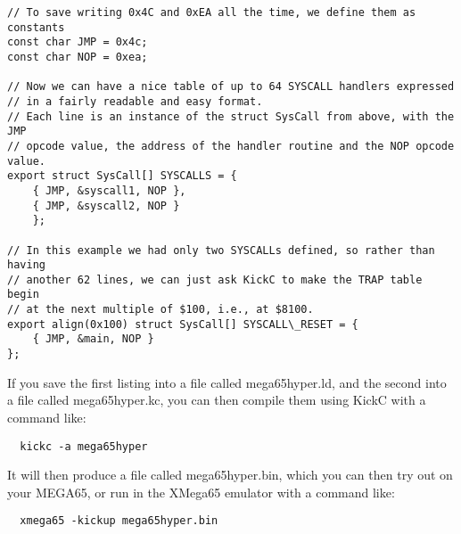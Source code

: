 \begin{tcolorbox}[colback=black,coltext=white]
\begin{verbatim}
// To save writing 0x4C and 0xEA all the time, we define them as constants
const char JMP = 0x4c;
const char NOP = 0xea;

// Now we can have a nice table of up to 64 SYSCALL handlers expressed
// in a fairly readable and easy format.
// Each line is an instance of the struct SysCall from above, with the JMP
// opcode value, the address of the handler routine and the NOP opcode value.
export struct SysCall[] SYSCALLS = {
    { JMP, &syscall1, NOP },
    { JMP, &syscall2, NOP }
    };

// In this example we had only two SYSCALLs defined, so rather than having
// another 62 lines, we can just ask KickC to make the TRAP table begin
// at the next multiple of $100, i.e., at $8100.
export align(0x100) struct SysCall[] SYSCALL\_RESET = {
    { JMP, &main, NOP }
};
\end{verbatim}
\end{tcolorbox}

If you save the first listing into a file called mega65hyper.ld, and the second
into a file called mega65hyper.kc, you can then compile them using KickC with
a command like:

\begin{tcolorbox}[colback=black,coltext=white]
\verbatimfont{\codefont}
\begin{verbatim}
  kickc -a mega65hyper
\end{verbatim}
\end{tcolorbox}

It will then produce a file called mega65hyper.bin, which you can then try out
on your MEGA65, or run in the XMega65 emulator with a command like:

\begin{tcolorbox}[colback=black,coltext=white]
\verbatimfont{\codefont}
\begin{verbatim}
  xmega65 -kickup mega65hyper.bin
\end{verbatim}
\end{tcolorbox}
